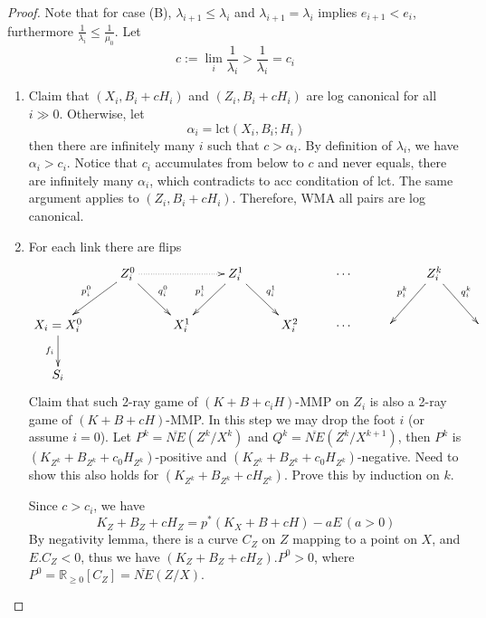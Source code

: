\documentclass{article}
\begin{document}
\begin{proof}
	Note that for case (B), $ \lambda_{i+1}\leqslant \lambda_i $ and $ \lambda_{i+1}=\lambda_i $ implies $ e_{i+1}<e_i $, furthermore $ \frac{1}{\lambda_i}\leqslant \frac{1}{\mu_0} $. Let
	$$ c:=\lim_{i}\frac{1}{\lambda_i}>\frac{1}{\lambda_i}=c_i $$
	\begin{enumerate}[Step 1]
		\item Claim that $ (X_i,B_i+cH_i) $ and $ (Z_i,B_i+cH_i) $ are log canonical for all $ i\gg 0 $. Otherwise, let
		$$ \alpha_i=\mathrm{lct}(X_i,B_i;H_i) $$
		then there are infinitely many $ i $ such that $ c>\alpha_i $. By definition of $ \lambda_i $, we have $ \alpha_i>c_i $. Notice that $ c_i $ accumulates from below to $ c $ and never equals, there are infinitely many $ \alpha_i $, which contradicts to acc conditation of lct. The same argument applies to $ (Z_i,B_i+cH_i) $. Therefore, WMA all pairs are log canonical.
		\item For each link there are flips
		$$ \xymatrix{
			&Z_i^0\ar[ld]_{p^0_i}\ar[dr]^{q^0_i}\ar@{.>}[rr]&&Z_i^1\ar[ld]_{p^1_i}\ar[rd]^{q^1_i}&&\cdots&&Z_i^k\ar[ld]_{p^k_i}\ar[dr]^{q^k_i}\\
			X_i=X^0_i\ar[d]_{f_i} &&X^1_i&&X_i^2&\cdots&&&\\
			S_i }$$
		Claim that such 2-ray game of $ (K+B+c_iH) $-MMP on $ Z_i $ is also a 2-ray game of $ (K+B+cH) $-MMP. In this step we may drop the foot $ i $ (or assume $ i=0 $). Let $ P^k=\overline{NE}(Z^k/X^k) $ and $ Q^k=\overline{NE}(Z^k/X^{k+1}) $, then $ P^k $ is $ (K_{Z^k}+B_{Z^k}+c_0H_{Z^k}) $-positive and $ (K_{Z^k}+B_{Z^k}+c_0H_{Z^k}) $-negative. Need to show this also holds for $ (K_{Z^k}+B_{Z^k}+cH_{Z^k}) $. Prove this by induction on $ k $.
		
		Since $ c>c_i $, we have 
		$$ K_Z+B_Z+cH_Z=p^*(K_X+B+cH)-aE\,(a>0) $$
		By negativity lemma, there is a curve $ C_Z $ on $ Z $ mapping to a point on $ X $, and $ E.C_Z<0 $, thus we have $ (K_Z+B_Z+cH_Z).P^0>0 $, where $ P^0=\mathbb{R}_{\geqslant0}[C_Z]=\overline{NE}(Z/X) $.
		

\end{enumerate}
\end{proof}
\end{document}
